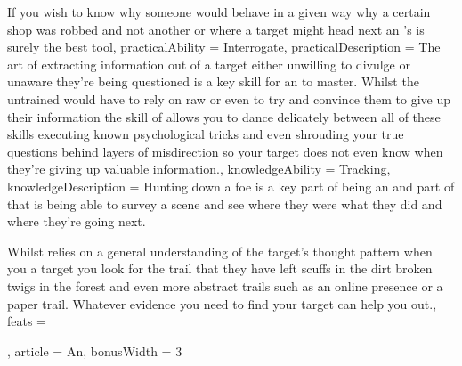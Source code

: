 {If you wish to know why someone would behave in a given way\comma{} why a certain shop was robbed and not another\comma{} or where a target might head next \minus{} an \name{}'s \imp{\innateAbility} is surely the best tool,
	practicalAbility = Interrogate,
	practicalDescription = The art of extracting information out of a target\comma{} either unwilling to divulge or unaware they're being questioned\comma{} is a key skill for an \imp{\name} to master.   Whilst the untrained would have to rely on raw \comma{} \comma{}  or even  to try and convince them to give up their information\comma{} the skill of  allows you to dance delicately between all of these skills\comma{} executing known psychological tricks and even shrouding your true questions behind layers of misdirection so your target does not even know when they're giving up valuable information.,
	knowledgeAbility = Tracking,
	knowledgeDescription = Hunting down a foe is a key part of being an \imp{\name}\comma{} and part of that is being able to survey a scene and see where they were\comma{} what they did\comma{} and where they're going next.

Whilst  relies on a general understanding of the target's thought pattern\comma{} when you  a target you look for the trail that they have left \minus{} scuffs in the dirt\comma{} broken twigs in the forest and even more abstract trails such as an online presence or a paper trail. Whatever evidence you need to find your target\comma{}  can help you out.,
	feats = 





,
	article = An,
	bonusWidth = 3
}

